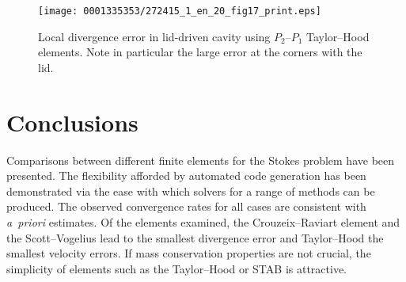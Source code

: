 \begin{figure}[!t]
\centering
\texttt{[image: 0001335353/272415\_1\_en\_20\_fig17\_print.eps]}
\caption{Local divergence error in lid-driven cavity using $P_2$--$P_1$
Taylor--Hood elements. Note in particular the large error at the corners with
the lid.}\label{fig:terrel:lid_div_error}
\end{figure}

\section{Conclusions}

Comparisons between different finite elements for the Stokes problem
have been presented. The flexibility afforded by automated code
generation has been demonstrated via the ease with which solvers for a
range of methods can be produced. The observed convergence rates for
all cases are consistent with \emph{a~priori} estimates. Of the
elements examined, the Crouzeix--Raviart element and the
Scott--Vogelius lead to the smallest divergence error and Taylor--Hood
the smallest velocity errors. If mass conservation properties are not
crucial, the simplicity of elements such as the Taylor--Hood or STAB
is attractive.

\endgroup


